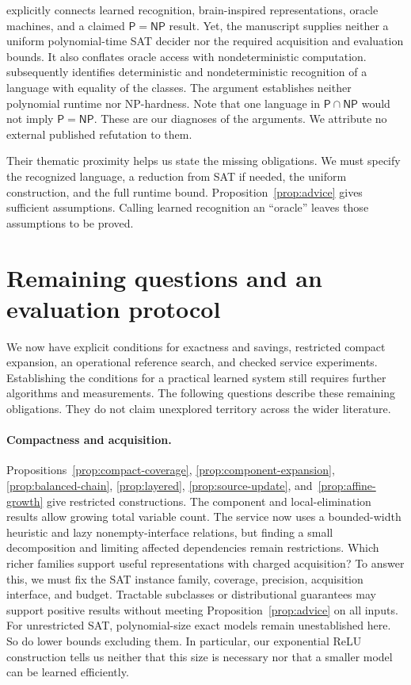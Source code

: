 \documentclass[11pt,a4paper]{article}
\numberwithin{equation}{section}
\newcommand{\Pclass}{\mathsf{P}}
\newcommand{\NPclass}{\mathsf{NP}}
\theoremstyle{plain}
\theoremstyle{definition}
\theoremstyle{remark}
\begin{document}
\citet{wen2010mirrored} explicitly connects learned recognition, brain-inspired representations, oracle machines, and a claimed $\Pclass=\NPclass$ result. Yet, the manuscript supplies neither a uniform polynomial-time SAT decider nor the required acquisition and evaluation bounds. It also conflates oracle access with nondeterministic computation. \citet{wen2010recognition} subsequently identifies deterministic and nondeterministic recognition of a language with equality of the classes. The argument establishes neither polynomial runtime nor NP-hardness. Note that one language in $\Pclass\cap\NPclass$ would not imply $\Pclass=\NPclass$. These are our diagnoses of the arguments. We attribute no external published refutation to them.

Their thematic proximity helps us state the missing obligations. We must specify the recognized language, a reduction from SAT if needed, the uniform construction, and the full runtime bound. Proposition~\ref{prop:advice} gives sufficient assumptions. Calling learned recognition an ``oracle'' leaves those assumptions to be proved.

\section{Remaining questions and an evaluation protocol}
\label{sec:open}

We now have explicit conditions for exactness and savings, restricted compact expansion, an operational reference search, and checked service experiments. Establishing the conditions for a practical learned system still requires further algorithms and measurements. The following questions describe these remaining obligations. They do not claim unexplored territory across the wider literature.

\paragraph{Compactness and acquisition.}
Propositions~\ref{prop:compact-coverage}, \ref{prop:component-expansion}, \ref{prop:balanced-chain}, \ref{prop:layered}, \ref{prop:source-update}, and~\ref{prop:affine-growth} give restricted constructions. The component and local-elimination results allow growing total variable count. The service now uses a bounded-width heuristic and lazy nonempty-interface relations, but finding a small decomposition and limiting affected dependencies remain restrictions. Which richer families support useful representations with charged acquisition? To answer this, we must fix the SAT instance family, coverage, precision, acquisition interface, and budget. Tractable subclasses or distributional guarantees may support positive results without meeting Proposition~\ref{prop:advice} on all inputs. For unrestricted SAT, polynomial-size exact models remain unestablished here. So do lower bounds excluding them. In particular, our exponential ReLU construction tells us neither that this size is necessary nor that a smaller model can be learned efficiently.
\end{document}
